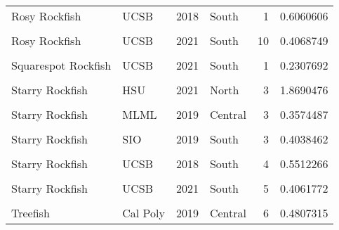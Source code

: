 \documentclass[
]{article}
\begin{document}
\begin{longtable}[t]{llrlrr}
Rosy Rockfish & UCSB & 2018 & South & 1 & 0.6060606\\
\cellcolor{gray!6}{Rosy Rockfish} & \cellcolor{gray!6}{UCSB} & \cellcolor{gray!6}{2019} & \cellcolor{gray!6}{South} & \cellcolor{gray!6}{3} & \cellcolor{gray!6}{0.5009713}\\
Rosy Rockfish & UCSB & 2021 & South & 10 & 0.4068749\\
\addlinespace
\cellcolor{gray!6}{Squarespot Rockfish} & \cellcolor{gray!6}{UCSB} & \cellcolor{gray!6}{2019} & \cellcolor{gray!6}{South} & \cellcolor{gray!6}{1} & \cellcolor{gray!6}{0.3409091}\\
Squarespot Rockfish & UCSB & 2021 & South & 1 & 0.2307692\\
\cellcolor{gray!6}{Starry Rockfish} & \cellcolor{gray!6}{Cal Poly} & \cellcolor{gray!6}{2021} & \cellcolor{gray!6}{Central} & \cellcolor{gray!6}{2} & \cellcolor{gray!6}{0.5000000}\\
Starry Rockfish & HSU & 2021 & North & 3 & 1.8690476\\
\cellcolor{gray!6}{Starry Rockfish} & \cellcolor{gray!6}{MLML} & \cellcolor{gray!6}{2018} & \cellcolor{gray!6}{Central} & \cellcolor{gray!6}{1} & \cellcolor{gray!6}{0.3991131}\\
\addlinespace
Starry Rockfish & MLML & 2019 & Central & 3 & 0.3574487\\
\cellcolor{gray!6}{Starry Rockfish} & \cellcolor{gray!6}{SIO} & \cellcolor{gray!6}{2018} & \cellcolor{gray!6}{South} & \cellcolor{gray!6}{1} & \cellcolor{gray!6}{0.3333333}\\
Starry Rockfish & SIO & 2019 & South & 3 & 0.4038462\\
\cellcolor{gray!6}{Starry Rockfish} & \cellcolor{gray!6}{SIO} & \cellcolor{gray!6}{2021} & \cellcolor{gray!6}{South} & \cellcolor{gray!6}{1} & \cellcolor{gray!6}{0.6666667}\\
Starry Rockfish & UCSB & 2018 & South & 4 & 0.5512266\\
\addlinespace
\cellcolor{gray!6}{Starry Rockfish} & \cellcolor{gray!6}{UCSB} & \cellcolor{gray!6}{2019} & \cellcolor{gray!6}{South} & \cellcolor{gray!6}{3} & \cellcolor{gray!6}{0.7159091}\\
Starry Rockfish & UCSB & 2021 & South & 5 & 0.4061772\\
\cellcolor{gray!6}{Treefish} & \cellcolor{gray!6}{Cal Poly} & \cellcolor{gray!6}{2018} & \cellcolor{gray!6}{Central} & \cellcolor{gray!6}{6} & \cellcolor{gray!6}{0.3660209}\\
Treefish & Cal Poly & 2019 & Central & 6 & 0.4807315\\

\end{longtable}
\end{document}
